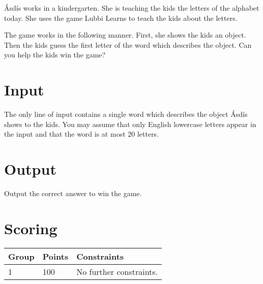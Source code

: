 
Ásdís works in a kindergarten.
She is teaching the kids the letters of the alphabet today.
She uses the game Lubbi Learns to teach the kids about the letters.

The game works in the following manner.
First, she shows the kids an object.
Then the kids guess the first letter of the word which describes the object.
Can you help the kids win the game?

\section*{Input}
The only line of input contains a single word which describes the object Ásdís shows to the kids.
You may assume that only English lowercase letters appear in the input and that the word is at most $20$ letters.

\section*{Output}
Output the correct answer to win the game.

\section*{Scoring}
\begin{tabular}{|l|l|l|}
\hline
Group & Points & Constraints \\ \hline
1     & 100    & No further constraints. \\ \hline
\end{tabular}
